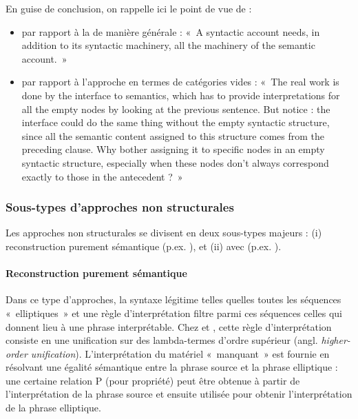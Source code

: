 En guise de conclusion, on rappelle ici le point de vue de \citet{CulicoverEtAl2005} :
\begin{itemize}
 \item par rapport à la  de manière générale : «~A syntactic account needs, in addition to its syntactic machinery, all the machinery of the semantic account.~»
\item par rapport à l’approche en termes de catégories vides : «~The real work is done by the interface to semantics, which has to provide interpretations for all the empty nodes by looking at the previous sentence. But notice : the interface could do the same thing without the empty syntactic structure, since all the semantic content assigned to this structure comes from the preceding clause. Why bother assigning it to specific nodes in an empty syntactic structure, especially when these nodes don’t always correspond exactly to those in the antecedent ?~»

\end{itemize}

 
\subsubsection{Sous-types d’approches non structurales}

Les approches non structurales se divisent en deux sous-types majeurs : (i) recons\-truction purement sémantique (p.ex. \citealt{DalrympleEtAl1991,Dalrymple2005}), et (ii)  avec  (p.ex. \citealt{GinzburgEtAl2000,CulicoverEtAl2005}).

\paragraph{Reconstruction purement sémantique}

Dans ce type d'approches, la syntaxe légitime telles quelles toutes les séquences «~elliptiques~» et une règle d’interprétation filtre parmi ces séquences celles qui donnent lieu à une phrase interprétable. Chez \citet{DalrympleEtAl1991} et \citet{Dalrymple2005}, cette règle d’interprétation consiste en une unification sur des lambda-termes d’ordre supérieur (angl. \textit{higher-order unification}). L’interprétation du matériel «~manquant~» est fournie en résolvant une égalité sémantique entre la phrase source et la phrase elliptique : une certaine relation P (pour propriété) peut être obtenue à partir de l’interprétation de la phrase source et ensuite utilisée pour obtenir l’interprétation de la phrase elliptique. 

